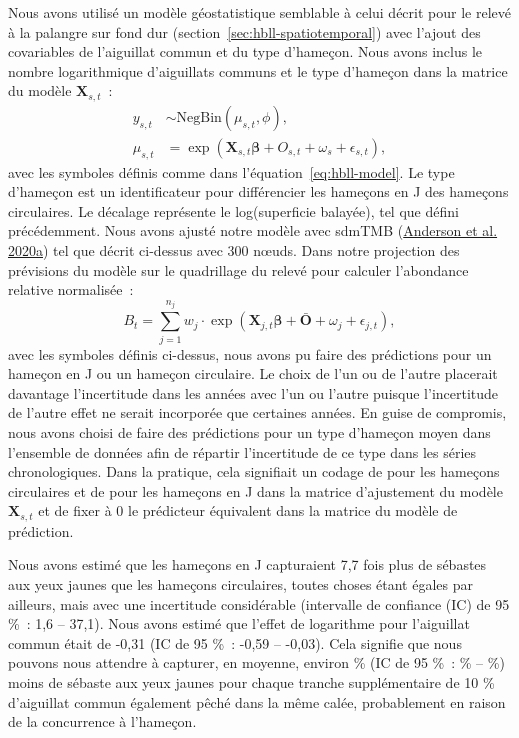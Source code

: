\documentclass[french,11pt]{book}
\begin{document}
Nous avons utilisé un modèle géostatistique semblable à celui décrit pour le relevé à la palangre sur fond dur (section~\ref{sec:hbll-spatiotemporal}) avec l'ajout des covariables de l'aiguillat commun et du type d'hameçon. Nous avons inclus le nombre logarithmique d'aiguillats communs et le type d'hameçon dans la matrice du modèle \(\bm{X}_{s,t}\)~:
\begin{align}
  y_{s,t} &\sim \mathrm{NegBin}(\mu_{s,t}, \phi),\\
  \mu_{s,t} &= \exp \left( \bm{X}_{s,t} \bm{\beta} + O_{s,t} + \omega_s + \epsilon_{s,t} \right),
\label{eq:dogfish-model}
\end{align}
avec les symboles définis comme dans l'équation~\ref{eq:hbll-model}. Le type d'hameçon est un identificateur pour différencier les hameçons en J des hameçons circulaires. Le décalage représente le log(superficie balayée), tel que défini précédemment. Nous avons ajusté notre modèle avec sdmTMB (\protect\hyperlink{ref-sdmtmb}{Anderson et al. 2020a}) tel que décrit ci-dessus avec 300 nœuds. Dans notre projection des prévisions du modèle sur le quadrillage du relevé pour calculer l'abondance relative normalisée~:
\begin{equation}
B_t = \sum_{j = 1}^{n_j}
  w_j \cdot \exp \left( \bm{X}_{j,t} \bm{\beta} + \bar{\bm{O}} + \omega_j + \epsilon_{j,t} \right),
\label{eq:dog-prediction}
\end{equation}
avec les symboles définis ci-dessus, nous avons pu faire des prédictions pour un hameçon en J ou un hameçon circulaire. Le choix de l'un ou de l'autre placerait davantage l'incertitude dans les années avec l'un ou l'autre puisque l'incertitude de l'autre effet ne serait incorporée que certaines années. En guise de compromis, nous avons choisi de faire des prédictions pour un type d'hameçon moyen dans l'ensemble de données afin de répartir l'incertitude de ce type dans les séries chronologiques. Dans la pratique, cela signifiait un codage de  pour les hameçons circulaires et de  pour les hameçons en J dans la matrice d'ajustement du modèle \(\bm{X}_{s,t}\) et de fixer à 0 le prédicteur équivalent dans la matrice du modèle de prédiction.

Nous avons estimé que les hameçons en J capturaient 7,7 fois plus de sébastes aux yeux jaunes que les hameçons circulaires, toutes choses étant égales par ailleurs, mais avec une incertitude considérable (intervalle de confiance (IC) de 95 \%~: 1,6 -- 37,1). Nous avons estimé que l'effet de logarithme pour l'aiguillat commun était de -0,31 (IC de 95 \%~: -0,59 -- -0,03). Cela signifie que nous pouvons nous attendre à capturer, en moyenne, environ \% (IC de 95 \%~: \% -- \%) moins de sébaste aux yeux jaunes pour chaque tranche supplémentaire de 10 \% d'aiguillat commun également pêché dans la même calée, probablement en raison de la concurrence à l'hameçon.
\end{document}
